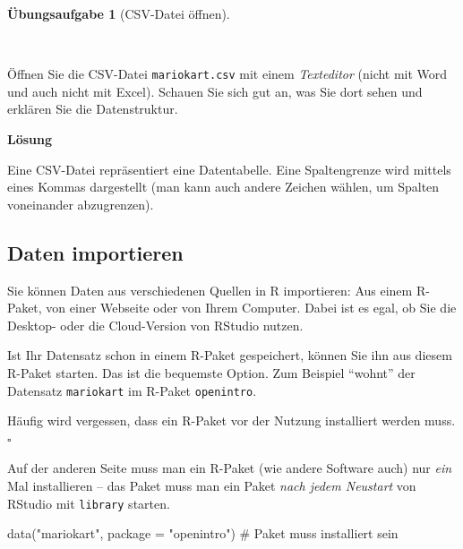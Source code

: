 \documentclass[
  letterpaper,
  twoside,
  open=any]{scrbook}
\newenvironment{Shaded}{\begin{snugshade}}{\end{snugshade}}
\newcommand{\AttributeTok}[1]{\textcolor[rgb]{0.40,0.45,0.13}{#1}}
\newcommand{\CommentTok}[1]{\textcolor[rgb]{0.37,0.37,0.37}{#1}}
\newcommand{\FunctionTok}[1]{\textcolor[rgb]{0.28,0.35,0.67}{#1}}
\newcommand{\NormalTok}[1]{\textcolor[rgb]{0.00,0.23,0.31}{#1}}
\newcommand{\StringTok}[1]{\textcolor[rgb]{0.13,0.47,0.30}{#1}}
\theoremstyle{definition}
\theoremstyle{definition}
\newtheorem{exercise}{Übungsaufgabe}[chapter]
\theoremstyle{definition}
\theoremstyle{remark}
\begin{document}
\begin{exercise}[CSV-Datei
öffnen]\protect\hypertarget{exr-csv}{}\label{exr-csv}

~

Öffnen Sie die CSV-Datei \texttt{mariokart.csv} mit einem
\emph{Texteditor} (nicht mit Word und auch nicht mit Excel). Schauen Sie
sich gut an, was Sie dort sehen und erklären Sie die Datenstruktur.

\textbf{Lösung}

Eine CSV-Datei repräsentiert eine Datentabelle. Eine Spaltengrenze wird
mittels eines Kommas dargestellt (man kann auch andere Zeichen wählen,
um Spalten voneinander abzugrenzen).

\end{exercise}

\subsection{Daten importieren}\label{sec-import-mariokart}

Sie können Daten aus verschiedenen Quellen in R importieren: Aus einem
R-Paket, von einer Webseite oder von Ihrem Computer. Dabei ist es egal,
ob Sie die Desktop- oder die Cloud-Version von RStudio nutzen.

Ist Ihr Datensatz schon in einem R-Paket gespeichert, können Sie ihn aus
diesem R-Paket starten. Das ist die bequemste Option. Zum Beispiel
\enquote{wohnt} der Datensatz \texttt{mariokart} im R-Paket
\texttt{openintro}.

\begin{tcolorbox}[enhanced jigsaw, colbacktitle=quarto-callout-tip-color!10!white, colframe=quarto-callout-tip-color-frame, coltitle=black, arc=.35mm, breakable, opacitybacktitle=0.6, toprule=.15mm, colback=white, rightrule=.15mm, opacityback=0, toptitle=1mm, title=\textcolor{quarto-callout-tip-color}{\faLightbulb}\hspace{0.5em}{Tipp}, titlerule=0mm, bottomtitle=1mm, bottomrule=.15mm, leftrule=.75mm, left=2mm]

Häufig wird vergessen, dass ein R-Paket vor der Nutzung installiert
werden muss. \(\square\)

\end{tcolorbox}

Auf der anderen Seite muss man ein R-Paket (wie andere Software auch)
nur \emph{ein} Mal installieren -- das Paket muss man ein Paket
\emph{nach jedem Neustart} von RStudio mit \texttt{library} starten.

\begin{Shaded}
\begin{Highlighting}[]
\FunctionTok{data}\NormalTok{(}\StringTok{"mariokart"}\NormalTok{, }\AttributeTok{package =} \StringTok{"openintro"}\NormalTok{) }\CommentTok{\# Paket muss installiert sein}
\end{Highlighting}
\end{Shaded}
\end{document}
